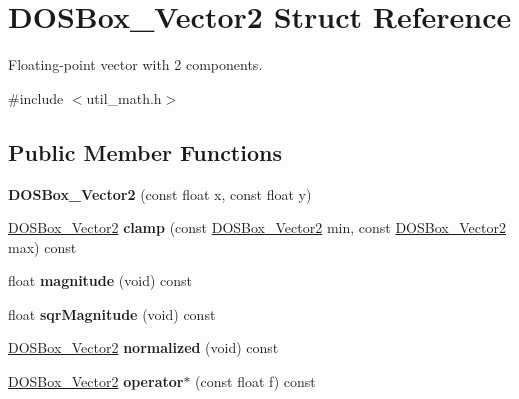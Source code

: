 \hypertarget{structDOSBox__Vector2}{\section{D\-O\-S\-Box\-\_\-\-Vector2 Struct Reference}
\label{structDOSBox__Vector2}
}


Floating-\/point vector with 2 components.  




{\ttfamily \#include $<$util\-\_\-math.\-h$>$}

\subsection*{Public Member Functions}
\begin{DoxyCompactItemize}
\item 
\hypertarget{structDOSBox__Vector2_a650c590b45f06a66b82f8be166880cac}{{\bfseries D\-O\-S\-Box\-\_\-\-Vector2} (const float x, const float y)}\label{structDOSBox__Vector2_a650c590b45f06a66b82f8be166880cac}

\item 
\hypertarget{structDOSBox__Vector2_abe47e749b58a18ded23bff67e4cf0c60}{\hyperlink{structDOSBox__Vector2}{D\-O\-S\-Box\-\_\-\-Vector2} {\bfseries clamp} (const \hyperlink{structDOSBox__Vector2}{D\-O\-S\-Box\-\_\-\-Vector2} min, const \hyperlink{structDOSBox__Vector2}{D\-O\-S\-Box\-\_\-\-Vector2} max) const }\label{structDOSBox__Vector2_abe47e749b58a18ded23bff67e4cf0c60}

\item 
\hypertarget{structDOSBox__Vector2_a8e8afe064e5b29e6081ae7fbd40f1756}{float {\bfseries magnitude} (void) const }\label{structDOSBox__Vector2_a8e8afe064e5b29e6081ae7fbd40f1756}

\item 
\hypertarget{structDOSBox__Vector2_a8b07ee4fe5014f0a29425f62d5781c9f}{float {\bfseries sqr\-Magnitude} (void) const }\label{structDOSBox__Vector2_a8b07ee4fe5014f0a29425f62d5781c9f}

\item 
\hypertarget{structDOSBox__Vector2_a1c5017ba9164077f6bf4c47412206a14}{\hyperlink{structDOSBox__Vector2}{D\-O\-S\-Box\-\_\-\-Vector2} {\bfseries normalized} (void) const }\label{structDOSBox__Vector2_a1c5017ba9164077f6bf4c47412206a14}

\item 
\hypertarget{structDOSBox__Vector2_ad113991305d5ce6062720234d7b47616}{\hyperlink{structDOSBox__Vector2}{D\-O\-S\-Box\-\_\-\-Vector2} {\bfseries operator$\ast$} (const float f) const }\label{structDOSBox__Vector2_ad113991305d5ce6062720234d7b47616}

\end{DoxyCompactItemize}
